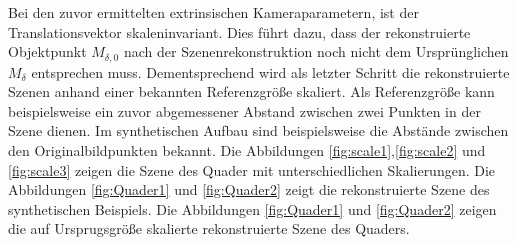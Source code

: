  
%

Bei den zuvor ermittelten extrinsischen Kameraparametern, ist der Translationsvektor skaleninvariant. Dies führt dazu, dass der rekonstruierte Objektpunkt $M_{\delta,0}$ nach der Szenenrekonstruktion noch nicht dem Ursprünglichen $M_\delta$ entsprechen muss. Dementsprechend wird als letzter Schritt die rekonstruierte Szenen anhand einer bekannten Referenzgröße skaliert. Als Referenzgröße kann beispielsweise ein zuvor abgemessener Abstand zwischen zwei Punkten in der Szene dienen. Im synthetischen Aufbau sind beispielsweise die Abstände zwischen den Originalbildpunkten bekannt. Die Abbildungen \ref{fig:scale1},\ref{fig:scale2} und \ref{fig:scale3} zeigen die Szene des Quader mit unterschiedlichen Skalierungen. Die Abbildungen \ref{fig:Quader1} und \ref{fig:Quader2} zeigt die rekonstruierte Szene des synthetischen Beispiels. Die Abbildungen \ref{fig:Quader1} und \ref{fig:Quader2} zeigen die auf Ursprugsgröße skalierte rekonstruierte Szene des Quaders. \\


%
%


